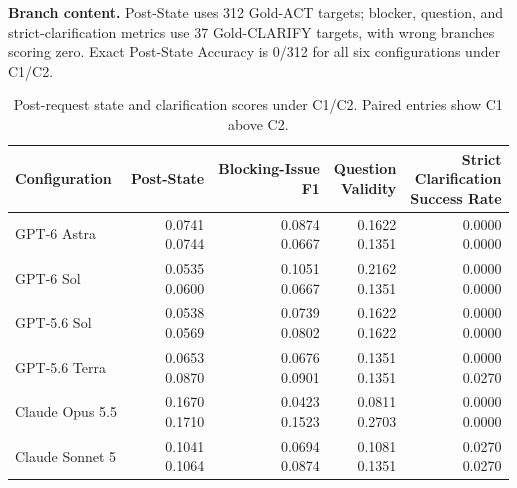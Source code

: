 \documentclass{article} %
\begin{document}
\textbf{Branch content.} Post-State uses 312 Gold-ACT targets; blocker, question, and strict-clarification metrics use 37 Gold-CLARIFY targets, with wrong branches scoring zero. Exact Post-State Accuracy is 0/312 for all six configurations under C1/C2.

\begin{table}[htbp]
\caption{Post-request state and clarification scores under C1/C2. Paired entries show C1 above C2.}
\label{tab:branch-content}
\centering\normalsize
\setlength{\tabcolsep}{3pt}
\renewcommand{\arraystretch}{1.08}
\begin{tabular}{@{}lrrrr@{}}
\toprule
Configuration & Post-State & \shortstack[c]{Blocking-Issue\\F1} & \shortstack[c]{Question\\Validity} & \shortstack[c]{Strict\\Clarification\\Success Rate} \\
\midrule
GPT-6 Astra & \shortstack[r]{0.0741\\0.0744} & \shortstack[r]{0.0874\\0.0667} & \shortstack[r]{0.1622\\0.1351} & \shortstack[r]{0.0000\\0.0000} \\
GPT-6 Sol & \shortstack[r]{0.0535\\0.0600} & \shortstack[r]{0.1051\\0.0667} & \shortstack[r]{0.2162\\0.1351} & \shortstack[r]{0.0000\\0.0000} \\
GPT-5.6 Sol & \shortstack[r]{0.0538\\0.0569} & \shortstack[r]{0.0739\\0.0802} & \shortstack[r]{0.1622\\0.1622} & \shortstack[r]{0.0000\\0.0000} \\
GPT-5.6 Terra & \shortstack[r]{0.0653\\0.0870} & \shortstack[r]{0.0676\\0.0901} & \shortstack[r]{0.1351\\0.1351} & \shortstack[r]{0.0000\\0.0270} \\
Claude Opus 5.5 & \shortstack[r]{0.1670\\0.1710} & \shortstack[r]{0.0423\\0.1523} & \shortstack[r]{0.0811\\0.2703} & \shortstack[r]{0.0000\\0.0000} \\
Claude Sonnet 5 & \shortstack[r]{0.1041\\0.1064} & \shortstack[r]{0.0694\\0.0874} & \shortstack[r]{0.1081\\0.1351} & \shortstack[r]{0.0270\\0.0270} \\
\bottomrule
\end{tabular}
\end{table}
\end{document}
